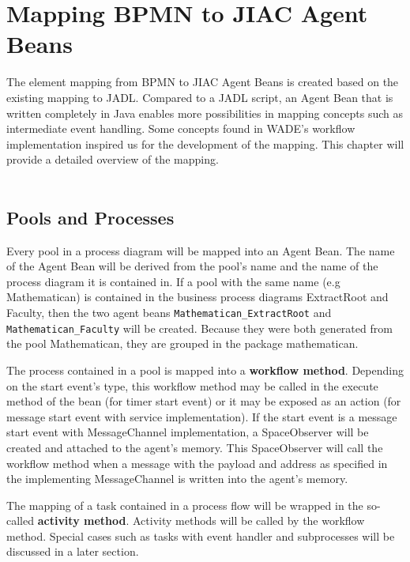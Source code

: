 \chapter{Mapping BPMN to JIAC Agent Beans}
\label{chap:mapping} 
The element mapping from BPMN to JIAC Agent Beans is created based on the existing mapping to JADL. Compared to a JADL script, an Agent Bean that is written completely in Java enables more possibilities in mapping concepts such as intermediate event handling. Some concepts found in WADE's workflow implementation inspired us for the development of the mapping. This chapter will provide a detailed overview of the mapping.\\\\

\section{Pools and Processes}
Every pool in a process diagram will be mapped into an Agent Bean. The name of the Agent Bean will be derived from the pool's name and the name of the process diagram it is contained in. If a pool with the same name (e.g Mathematican) is contained in the business process diagrams ExtractRoot and Faculty, then the two agent beans \texttt{Mathematican\_ExtractRoot} and \texttt{Mathematican\_Faculty} will be created. Because they were both generated from the pool Mathematican, they are grouped in the package mathematican. 

The process contained in a pool is mapped into a \textbf{workflow method}. Depending on the start event's type, this workflow method may be called in the execute method of the bean (for timer start event) or it may be exposed as an action (for message start event with service implementation). If the start event is a message start event with MessageChannel implementation, a SpaceObserver will be created and attached to the agent's memory. This SpaceObserver will call the workflow method when a message with the payload and address as specified in the implementing MessageChannel is written into the agent's memory.

The mapping of a task contained in a process flow will be wrapped in the so-called \textbf{activity method}. Activity methods will be called by the workflow method. Special cases such as tasks with event handler and subprocesses will be discussed in a later section.

